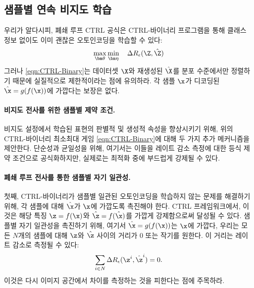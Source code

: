 \documentclass[../../book-main_ko.tex]{subfiles}
\begin{document}
\subsection{샘플별 연속 비지도 학습}
\label{sec:sample-wise-incremental}

우리가 알다시피, 폐쇄 루프 CTRL 공식은 CTRL-바이너리 프로그램을 통해 클래스 정보 없이도 이미 괜찮은 오토인코딩을 학습할 수 있다:
\begin{align}
      \max_{\bm \theta} \min_{\bm \eta} \quad \Delta R_\epsilon(\Z, \hat{\Z}) 
 \label{eqn:CTRL-Binary}
\end{align}
그러나 \eqref{eqn:CTRL-Binary}는 데이터셋 $\X$와 재생성된 $\hat \X$를 분포 수준에서만 정렬하기 때문에 실질적으로 제한적이라는 점에 유의하라.
각 샘플 $\x$가 디코딩된 $\hat \x = g(f(\x))$에 가깝다는 보장은 없다.

\paragraph{비지도 전사를 위한 샘플별 제약 조건.}
\label{sec:constraints}
비지도 설정에서 학습된 표현의 판별적 및 생성적 속성을 향상시키기 위해, 위의 CTRL-바이너리 최소최대 게임 \eqref{eqn:CTRL-Binary}에 대해 두 가지 추가 메커니즘을 제안한다. 단순성과 균일성을 위해, 여기서는 이들을 레이트 감소 측정에 대한 등식 제약 조건으로 공식화하지만, 실제로는 최적화 중에 부드럽게 강제될 수 있다.

\paragraph{폐쇄 루프 전사를 통한 샘플별 자기 일관성.} 
첫째, CTRL-바이너리가 샘플별 일관된 오토인코딩을 학습하지 않는 문제를 해결하기 위해, 각 샘플에 대해 $\hat \x$가 $\x$에 가깝도록 촉진해야 한다. CTRL 프레임워크에서, 이것은 해당 특징 $\z=f(\x)$와 $\hat \z = f(\hat \x)$를 가깝게 강제함으로써 달성될 수 있다.
샘플별 자기 일관성을 촉진하기 위해, 여기서 $\hat{\x} = g(f(\x))$는 $\x$에 가깝다, 우리는 모든 $N$개의 샘플에 대해 $\z$와 $\hat{\z}$ 사이의 거리가 0 또는 작기를 원한다.
이 거리는 레이트 감소로 측정될 수 있다:
\begin{align}
\sum_{i\in N} \Delta R_\epsilon(\z^i,\hat{\z}^i) = 0.
\label{eqn:sample-self-consistency}\vspace{-2mm}
\end{align}
이것은 다시 이미지 공간에서 차이를 측정하는 것을 피한다는 점에 주목하라.
\end{document}
